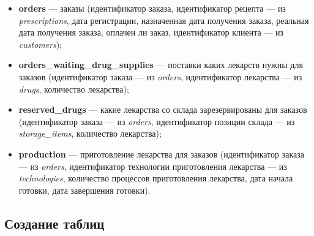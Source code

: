 \documentclass[a4paper]{article}
\newcommand{\dbtable}[1]{\textbf{#1}}
\newcommand{\dbtableref}[1]{\textit{#1}}
\begin{document}
\begin{itemize}
				\item \dbtable{orders} --- заказы (идентификатор заказа, идентификатор рецепта --- из \dbtableref{prescriptions}, дата регистрации, назначенная дата получения заказа, реальная дата получения заказа, оплачен ли заказ, идентификатор клиента --- из \dbtableref{customers});
					
				\item \dbtable{orders\_waiting\_drug\_supplies} --- поставки каких лекарств нужны для заказов (идентификатор заказа --- из \dbtableref{orders}, идентификатор лекарства --- из \dbtableref{drugs}, количество лекарства);
					
				\item \dbtable{reserved\_drugs} --- какие лекарства со склада зарезервированы для заказов (идентификатор заказа --- из \dbtableref{orders}, идентификатор позиции склада --- из \dbtableref{storage\_items}, количество лекарства);
					
				\item \dbtable{production} --- приготовление лекарства для заказов (идентификатор заказа --- из \dbtableref{orders}, идентификатор технологии приготовления лекарства --- из \dbtableref{technologies}, количество процессов приготовления лекарства, дата начала готовки, дата завершения готовки).
			\end{itemize}
		\subsection{Создание таблиц}
			
\end{document}
